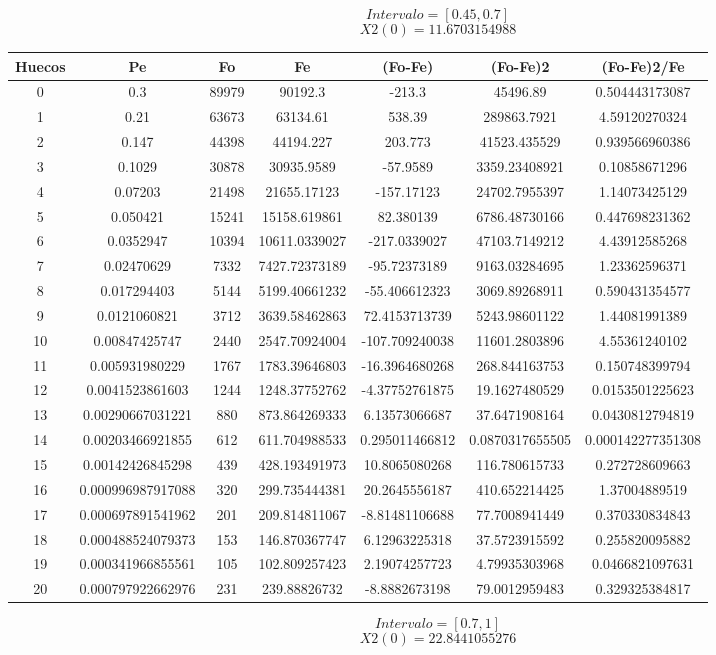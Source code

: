 \documentclass{article}
\begin{document}
$$
Intervalo = [0.45, 0.7]
$$
$$
X2(0) = 11.6703154988
$$
\begin{tabular}{|c|c|c|c|c|c|c|}
Huecos&Pe&Fo&Fe&(Fo{-}Fe)&(Fo{-}Fe)2&(Fo{-}Fe)2/Fe\\
\hline
0&0.3&89979&90192.3&{-}213.3&45496.89&0.504443173087\\
\hline
1&0.21&63673&63134.61&538.39&289863.7921&4.59120270324\\
\hline
2&0.147&44398&44194.227&203.773&41523.435529&0.939566960386\\
\hline
3&0.1029&30878&30935.9589&{-}57.9589&3359.23408921&0.10858671296\\
\hline
4&0.07203&21498&21655.17123&{-}157.17123&24702.7955397&1.14073425129\\
\hline
5&0.050421&15241&15158.619861&82.380139&6786.48730166&0.447698231362\\
\hline
6&0.0352947&10394&10611.0339027&{-}217.0339027&47103.7149212&4.43912585268\\
\hline
7&0.02470629&7332&7427.72373189&{-}95.72373189&9163.03284695&1.23362596371\\
\hline
8&0.017294403&5144&5199.40661232&{-}55.406612323&3069.89268911&0.590431354577\\
\hline
9&0.0121060821&3712&3639.58462863&72.4153713739&5243.98601122&1.44081991389\\
\hline
10&0.00847425747&2440&2547.70924004&{-}107.709240038&11601.2803896&4.55361240102\\
\hline
11&0.005931980229&1767&1783.39646803&{-}16.3964680268&268.844163753&0.150748399794\\
\hline
12&0.0041523861603&1244&1248.37752762&{-}4.37752761875&19.1627480529&0.0153501225623\\
\hline
13&0.00290667031221&880&873.864269333&6.13573066687&37.6471908164&0.0430812794819\\
\hline
14&0.00203466921855&612&611.704988533&0.295011466812&0.0870317655505&0.000142277351308\\
\hline
15&0.00142426845298&439&428.193491973&10.8065080268&116.780615733&0.272728609663\\
\hline
16&0.000996987917088&320&299.735444381&20.2645556187&410.652214425&1.37004889519\\
\hline
17&0.000697891541962&201&209.814811067&{-}8.81481106688&77.7008941449&0.370330834843\\
\hline
18&0.000488524079373&153&146.870367747&6.12963225318&37.5723915592&0.255820095882\\
\hline
19&0.000341966855561&105&102.809257423&2.19074257723&4.79935303968&0.0466821097631\\
\hline
20&0.000797922662976&231&239.88826732&{-}8.8882673198&79.0012959483&0.329325384817\\
\end{tabular}
$$
Intervalo = [0.7, 1]
$$
$$
X2(0) = 22.8441055276
$$
\end{document}
